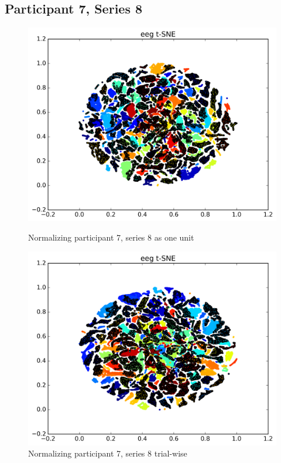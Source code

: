\documentclass{article} %
\begin{document}
\subsection{Participant 7, Series 8}
\begin{figure}
	\centering
	\begin{minipage}{0.5\textwidth}
		\centering
		\includegraphics[width=1.0\textwidth]{P7S8u.png}
		\caption{Normalizing participant 7, series 8 as one unit}
		\label{fig:P7S8u}
	\end{minipage}\hfill
	\begin{minipage}{0.5\textwidth}
		\centering
		\includegraphics[width=1.0\textwidth]{P7S8t.png}
		\caption{Normalizing participant 7, series 8 trial-wise}
		\label{fig:P7S8t}
	\end{minipage}
\end{figure}
\end{document}

